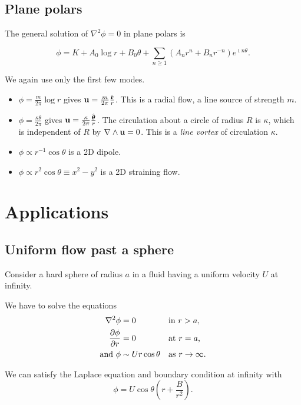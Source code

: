 \documentclass{notes}
\newcommand{\curl}{\nabla\wedge}
\newcommand{\lapl}{\nabla^2}
\begin{document}
\subsection*{Plane polars}

The general solution of $\lapl\phi=0$ in plane polars is

\[
\phi = K + A_0 \log r + B_0 \theta + \sum_{n \ge 1} \left(
A_n r^n + B_n r^{-n} \right) e^{\imath n \theta}.
\]

We again use only the first few modes.

\begin{itemize}
\item $\phi = \frac{m}{2\pi} \log r$ gives $\mathbf{u} = \frac{m}{2 \pi}
  \frac{\Hat{\mathbf{r}}}{r}$.  This is a radial flow, a line source of
  strength $m$.
\item $\phi = \frac{\kappa \theta}{2 \pi}$ gives $\mathbf{u} = \frac{\kappa}{2
    \pi} \frac{\Hat{\boldsymbol\theta}}{r}$.  The circulation about a
  circle of radius $R$ is $\kappa$, which is independent of $R$ by
  $\curl\vu=0$.  This is a \emph{line vortex} of circulation $\kappa$.
\item $\phi \propto r^{-1} \cos \theta$ is a 2D dipole.
\item $\phi \propto r^2 \cos \theta \equiv x^2 - y^2$ is a 2D
  straining flow.
\end{itemize}

\section{Applications}

\subsection{Uniform flow past a sphere}\label{sec:Usphere}

Consider a hard sphere of radius $a$ in a fluid having a uniform
velocity $U$ at infinity.

We have to solve the equations
\begin{align*}
\lapl\phi &= 0 &&\text{in $r > a$,} \\
\pd{\phi}{r} &= 0 &&\text{at $r=a$,} \\
\text{and } \phi &\sim U r \cos \theta &&\text{as $r \to \infty$.}
\end{align*}

We can satisfy the Laplace equation and boundary condition at infinity
with
\[
\phi = U \cos \theta \left( r + \frac{B}{r^2}\right).
\]
\end{document}
